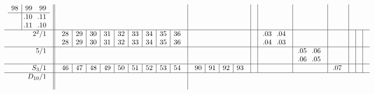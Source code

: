 \documentclass[12pt,a4paper]{amsart}
\begin{document}
\begin{align*}
\begin{array}{r||c|c|c|c|c|c|c|c|c}
\begin{array}{c|cc}
      98&99&99\\
\hline
&\llap.10&\llap.11\\
&\llap.11&\llap.10\\
    \end{array}
&&&&&& \\\hline
    \begin{array}{r}
      2^2/1 \\ \\
    \end{array}
&
  \begin{array}{c|c|c|c|c|c|c|c|c}
    28&29&30&31&32&33&34&35&36\\
    28&29&30&31&32&33&34&35&36\\
  \end{array}
&&&
    \begin{array}{cc}
\llap.03&\llap.04\\
\llap.04&\llap.03\\
    \end{array}
&&&&& \\\hline
    \begin{array}{r}
      5/1 \\ \\
    \end{array}
&&&&&
    \begin{array}{cc}
\llap.05&\llap.06\\
\llap.06&\llap.05\\
    \end{array}
&&&& \\\hline
    \begin{array}{r}
      S_3/1 \\
    \end{array}
&
  \begin{array}{c|c|c|c|c|c|c|c|c}
    46&47&48&49&50&51&52&53&54\\
  \end{array}
&
   \begin{array}{c|c|c|c}
90&91&92&93\\
   \end{array}
&&&&
    \begin{array}{c}
\llap.07\\
    \end{array}
&&& \\\hline
    \begin{array}{r}
      D_{10}/1 \\ \\
    \end{array}
&
  \begin{array}{c|c|c|c|c|c|c|c|c}

\end{array}
\end{array}
\end{align*}
\end{document}
